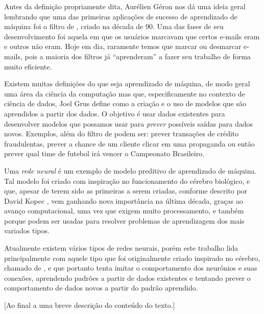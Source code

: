 Antes da definição propriamente dita, Aurélien Géron \citep{hands} nos dá uma ideia geral lembrando que uma das primeiras aplicações de sucesso de aprendizado de máquina foi o filtro de , criado na década de 90. Uma das fases de seu desenvolvimento foi aquela em que os usuários marcavam que certos e-mails eram  e outros não eram. Hoje em dia, raramente temos que marcar ou desmarcar e-mails, pois a maioria dos filtros já ``aprenderam'' a fazer seu trabalho de forma muito eficiente.

Existem muitas definições do que seja aprendizado de máquina, de modo geral uma área da ciência da computação mas que, especificamente no contexto de ciência de dados, Joel Grus \citep{data} define como a criação e o uso de modelos que são aprendidos a partir dos dados. O objetivo é usar dados existentes para desenvolver modelos que possamos usar para \emph{prever} possíveis saídas para dados novos. Exemplos, além do filtro de  podem ser: prever transações de crédito fraudulentas, prever a chance de um cliente clicar em uma propaganda ou então prever qual time de futebol irá vencer o Campeonato Brasileiro.

Uma \emph{rede neural} é um exemplo de modelo preditivo de aprendizado de máquina. Tal modelo foi criado com inspiração no funcionamento do cérebro biológico, e que, apesar de terem sido as primeiras a serem criadas, conforme descrito por David Kopec \citep{classic}, vem ganhando nova importância na última década, graças ao avanço computacional, uma vez que exigem muito processamento, e também porque podem ser usadas para resolver problemas de aprendizagem dos mais variados tipos.

Atualmente existem vários tipos de redes neurais, porém este trabalho lida principalmente com aquele tipo que foi originalmente criado inspirado no cérebro, chamado de , e que portanto tenta imitar o comportamento dos neurônios e suas conexões, aprendendo padrões a partir de dados existentes e tentando prever o comportamento de dados novos a partir do padrão aprendido.

[Ao final a uma breve descrição do conteúdo do texto.]
